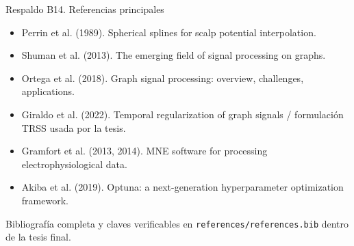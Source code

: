\documentclass[aspectratio=169,10pt]{beamer}
\begin{document}
\begin{frame}{Respaldo B14. Referencias principales}
\footnotesize
\begin{itemize}
\item Perrin et al. (1989). Spherical splines for scalp potential interpolation.
\item Shuman et al. (2013). The emerging field of signal processing on graphs.
\item Ortega et al. (2018). Graph signal processing: overview, challenges, applications.
\item Giraldo et al. (2022). Temporal regularization of graph signals / formulación TRSS usada por la tesis.
\item Gramfort et al. (2013, 2014). MNE software for processing electrophysiological data.
\item Akiba et al. (2019). Optuna: a next-generation hyperparameter optimization framework.
\end{itemize}
\vspace{0.5em}
Bibliografía completa y claves verificables en \texttt{references/references.bib} dentro de la tesis final.
\end{frame}
\end{document}
